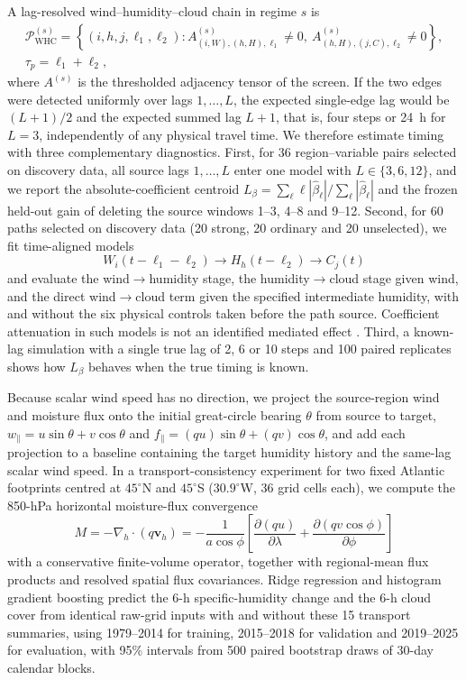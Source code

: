 \documentclass[preprint,12pt]{elsarticle}
\begin{document}
A lag-resolved wind--humidity--cloud chain in regime $s$ is
\begin{multline}
\mathcal{P}^{(s)}_{\mathrm{WHC}}=\left\{(i,h,j,\ell_1,\ell_2):A^{(s)}_{(i,W),(h,H),\ell_1}\neq0,\ A^{(s)}_{(h,H),(j,C),\ell_2}\neq0\right\},\\
\tau_p=\ell_1+\ell_2,
\end{multline}
where $A^{(s)}$ is the thresholded adjacency tensor of the screen. If the two edges were detected uniformly over lags $1,\ldots,L$, the expected single-edge lag would be $(L+1)/2$ and the expected summed lag $L+1$, that is, four steps or 24~h for $L=3$, independently of any physical travel time. We therefore estimate timing with three complementary diagnostics. First, for 36 region--variable pairs selected on discovery data, all source lags $1,\ldots,L$ enter one model with $L\in\{3,6,12\}$, and we report the absolute-coefficient centroid $L_\beta=\sum_{\ell}\ell|\widehat{\beta}_\ell|/\sum_\ell|\widehat{\beta}_\ell|$ and the frozen held-out gain of deleting the source windows 1--3, 4--8 and 9--12. Second, for 60 paths selected on discovery data (20 strong, 20 ordinary and 20 unselected), we fit time-aligned models
\begin{equation}
W_i(t-\ell_1-\ell_2)\rightarrow H_h(t-\ell_2)\rightarrow C_j(t)
\end{equation}
and evaluate the wind$\rightarrow$humidity stage, the humidity$\rightarrow$cloud stage given wind, and the direct wind$\rightarrow$cloud term given the specified intermediate humidity, with and without the six physical controls taken before the path source. Coefficient attenuation in such models is not an identified mediated effect \citep{Nguyen2021Mediation}. Third, a known-lag simulation with a single true lag of 2, 6 or 10 steps and 100 paired replicates shows how $L_\beta$ behaves when the true timing is known.

Because scalar wind speed has no direction, we project the source-region wind and moisture flux onto the initial great-circle bearing $\theta$ from source to target, $w_{\parallel}=u\sin\theta+v\cos\theta$ and $f_{\parallel}=(qu)\sin\theta+(qv)\cos\theta$, and add each projection to a baseline containing the target humidity history and the same-lag scalar wind speed. In a transport-consistency experiment for two fixed Atlantic footprints centred at $45^\circ$N and $45^\circ$S ($30.9^\circ$W, 36 grid cells each), we compute the 850-hPa horizontal moisture-flux convergence
\begin{equation}
M=-\nabla_h\cdot(q\mathbf{v}_h)=-\frac{1}{a\cos\phi}\left[\frac{\partial(qu)}{\partial\lambda}+\frac{\partial(qv\cos\phi)}{\partial\phi}\right]
\end{equation}
with a conservative finite-volume operator, together with regional-mean flux products and resolved spatial flux covariances. Ridge regression and histogram gradient boosting predict the 6-h specific-humidity change and the 6-h cloud cover from identical raw-grid inputs with and without these 15 transport summaries, using 1979--2014 for training, 2015--2018 for validation and 2019--2025 for evaluation, with 95\% intervals from 500 paired bootstrap draws of 30-day calendar blocks.
\end{document}
